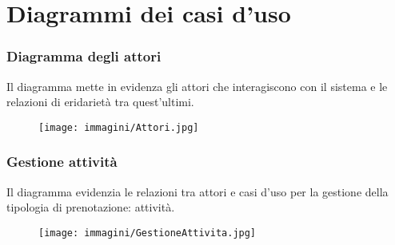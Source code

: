 \documentclass[11pt,a4paper]{report}
\begin{document}
\section{Diagrammi dei casi d'uso}
\subsubsection{Diagramma degli attori}
Il diagramma mette in evidenza gli attori che interagiscono con il sistema e le relazioni di eridarietà tra quest'ultimi.\\
\begin{figure}[h!]
  \centering
\texttt{[image: immagini/Attori.jpg]}
\end{figure}



\subsubsection{Gestione attività}
Il diagramma evidenzia le relazioni tra attori e casi d'uso per la gestione della tipologia di prenotazione: attività.\\
\begin{figure}[h!]
  \centering
\texttt{[image: immagini/GestioneAttivita.jpg]}
\end{figure}
\newpage

\end{document}
